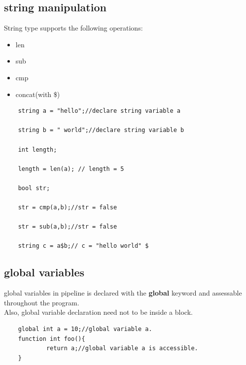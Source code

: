 \documentclass[./Report_main.tex]{subfiles}
\begin{document}
\subsection{string manipulation}
String type supports the following operations:\\
\begin{itemize}
    \item len
    \item sub
    \item cmp
    \item concat(with \$)
\end{itemize}
\begin{lstlisting}
    string a = "hello";//declare string variable a
    
    string b = " world";//declare string variable b
    
    int length;
    
    length = len(a); // length = 5
    
    bool str;
    
    str = cmp(a,b);//str = false
    
    str = sub(a,b);//str = false
    
    string c = a$b;// c = "hello world" $
\end{lstlisting}
\subsection{global variables}
global variables in pipeline is declared with the \textbf{global} keyword and assessable throughout the program.\\
Also, global variable declaration need not to be inside a block.\\
\begin{lstlisting}
    global int a = 10;//global variable a.
    function int foo(){
            return a;//global variable a is accessible.
    }
\end{lstlisting}
\end{document}
